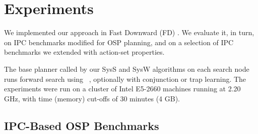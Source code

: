 

\newcommand{\scatterplotsize}{8cm}
\newcommand{\scatterplotxlabelshift}{1.5ex}
\newcommand{\scatterplotylabelshift}{-3ex}



\section{Experiments}
\label{experiments}


We implemented our approach in Fast Downward
(FD) \cite{helmert:jair-06}. We evaluate it, in turn, on IPC
benchmarks modified for OSP planning, and on a selection of IPC
benchmarks we extended with action-set properties.

The base planner called by our SysS and SysW algorithms on each search
node runs forward search using
\hff\ \cite{hoffmann:nebel:jair-01}, optionally with conjunction or trap learning.
%
%
The experiments were run on a cluster of Intel E5-2660 machines
running at 2.20 GHz, with time (memory) cut-offs of 30 minutes (4 GB).



 




\subsection{IPC-Based OSP Benchmarks}

%

